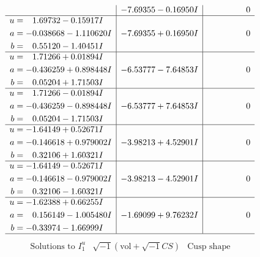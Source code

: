 \documentclass[1p]{elsarticle_modified}
\theoremstyle{definition}
\newcommand{\I}{\sqrt{-1}}
\begin{document}
$$\begin{array}{c|c|c}
 & -7.69355 - 0.16950 I & \phantom{-0.000000 } 0 \\ \hline\begin{aligned}
u &= \phantom{-}1.69732 - 0.15917 I \\
a &= -0.038668 - 1.110620 I \\
b &= \phantom{-}0.55120 - 1.40451 I\end{aligned}
 & -7.69355 + 0.16950 I & \phantom{-0.000000 } 0 \\ \hline\begin{aligned}
u &= \phantom{-}1.71266 + 0.01894 I \\
a &= -0.436259 + 0.898448 I \\
b &= \phantom{-}0.05204 + 1.71503 I\end{aligned}
 & -6.53777 - 7.64853 I & \phantom{-0.000000 } 0 \\ \hline\begin{aligned}
u &= \phantom{-}1.71266 - 0.01894 I \\
a &= -0.436259 - 0.898448 I \\
b &= \phantom{-}0.05204 - 1.71503 I\end{aligned}
 & -6.53777 + 7.64853 I & \phantom{-0.000000 } 0 \\ \hline\begin{aligned}
u &= -1.64149 + 0.52671 I \\
a &= -0.146618 + 0.979002 I \\
b &= \phantom{-}0.32106 + 1.60321 I\end{aligned}
 & -3.98213 + 4.52901 I & \phantom{-0.000000 } 0 \\ \hline\begin{aligned}
u &= -1.64149 - 0.52671 I \\
a &= -0.146618 - 0.979002 I \\
b &= \phantom{-}0.32106 - 1.60321 I\end{aligned}
 & -3.98213 - 4.52901 I & \phantom{-0.000000 } 0 \\ \hline\begin{aligned}
u &= -1.62388 + 0.66255 I \\
a &= \phantom{-}0.156149 - 1.005480 I \\
b &= -0.33974 - 1.66999 I\end{aligned}
 & -1.69099 + 9.76232 I & \phantom{-0.000000 } 0\\
 \hline 
 \end{array}$$\newpage$$\begin{array}{c|c|c}  
\text{Solutions to }I^u_{1}& \I (\text{vol} + \sqrt{-1}CS) & \text{Cusp shape}\\

\end{array}$$
\end{document}
